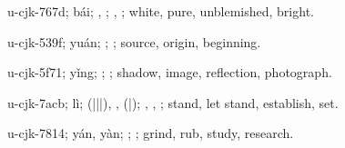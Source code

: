 \begin{multicols}{2}
{\cjkgGlue{}u-cjk-767d; bái; \cjkgGlue{}\cjkgGlue{}\cjkgGlue{}, \cjkgGlue{}; \cjkgGlue{}, \cjkgGlue{}; white, pure, unblemished, bright.

\cjkgGlue{}u-cjk-539f; yuán; \cjkgGlue{}; \cjkgGlue{}; source, origin, beginning.

\cjkgGlue{}u-cjk-5f71; yǐng; \cjkgGlue{}; \cjkgGlue{}; shadow, image, reflection, photograph.

\cjkgGlue{}u-cjk-7acb; lì; \cjkgGlue{}\cjkgGlue{}(\cjkgGlue{}|\cjkgGlue{}|\cjkgGlue{}|\cjkgGlue{}), \cjkgGlue{}, \cjkgGlue{}\cjkgGlue{}(\cjkgGlue{}|\cjkgGlue{}); \cjkgGlue{}, \cjkgGlue{}, \cjkgGlue{}; stand, let stand, establish, set.

\cjkgGlue{}u-cjk-7814; yán, yàn; \cjkgGlue{}\cjkgGlue{}\cjkgGlue{}; \cjkgGlue{}; grind, rub, study, research.

}
\end{multicols}
